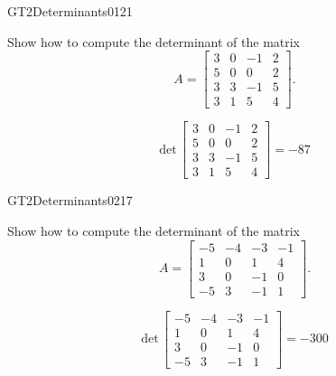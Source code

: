 \newpage




\begin{exercise}{GT2}{Determinants}{0121} 
\begin{exerciseStatement} 

Show how to compute the determinant of the matrix \[A=\left[\begin{array}{cccc}
3 & 0 & -1 & 2 \\
5 & 0 & 0 & 2 \\
3 & 3 & -1 & 5 \\
3 & 1 & 5 & 4
\end{array}\right].\]

 \end{exerciseStatement}
 \begin{exerciseAnswer} \[\mathrm{det}\,\left[\begin{array}{cccc}
3 & 0 & -1 & 2 \\
5 & 0 & 0 & 2 \\
3 & 3 & -1 & 5 \\
3 & 1 & 5 & 4
\end{array}\right]=-87\] \end{exerciseAnswer}
 \end{exercise}



\begin{exercise}{GT2}{Determinants}{0217} 
\begin{exerciseStatement} 

Show how to compute the determinant of the matrix \[A=\left[\begin{array}{cccc}
-5 & -4 & -3 & -1 \\
1 & 0 & 1 & 4 \\
3 & 0 & -1 & 0 \\
-5 & 3 & -1 & 1
\end{array}\right].\]

 \end{exerciseStatement}
 \begin{exerciseAnswer} \[\mathrm{det}\,\left[\begin{array}{cccc}
-5 & -4 & -3 & -1 \\
1 & 0 & 1 & 4 \\
3 & 0 & -1 & 0 \\
-5 & 3 & -1 & 1
\end{array}\right]=-300\] \end{exerciseAnswer}
 \end{exercise}


\newpage




